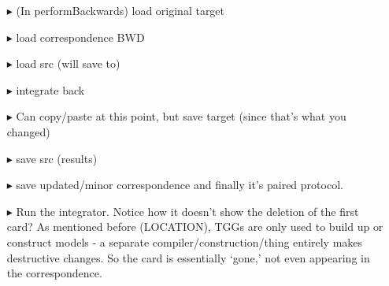 \begin{itemize}
\item[$\blacktriangleright$] (In performBackwards) load original target

\item[$\blacktriangleright$] load correspondence BWD

\item[$\blacktriangleright$] load src (will save to)

\item[$\blacktriangleright$] integrate back

\item[$\blacktriangleright$] Can copy/paste at this point, but save target (since that's what you changed)

\item[$\blacktriangleright$] save src (results)

\item[$\blacktriangleright$] save updated/minor correspondence and finally it's paired protocol.

\item[$\blacktriangleright$] Run the integrator. Notice how it doesn't show the deletion of the first card? As mentioned before (LOCATION), TGGs are only used
to build up or construct models - a separate compiler/construction/thing entirely makes destructive changes. So the card is essentially `gone,' not even
appearing in the correspondence.

\end{itemize}

